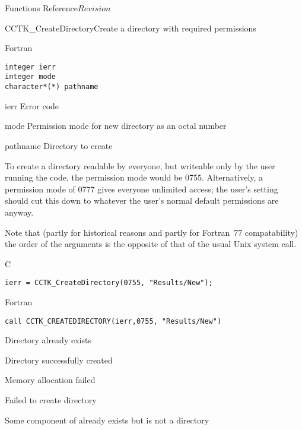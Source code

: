 \begin{cactuspart}{ Functions Reference}{}{$Revision$}
\begin{FunctionDescription}{CCTK\_CreateDirectory}{Create a directory with required permissions}
\begin{SynopsisSection}
\begin{Synopsis}{Fortran}
\begin{verbatim}
integer ierr
integer mode
character*(*) pathname \end{verbatim}
\end{Synopsis}
\end{SynopsisSection}
\begin{ParameterSection}
\begin{Parameter}{ierr}
Error code
\end{Parameter}
\begin{Parameter}{mode}
Permission mode for new directory as an octal number
\end{Parameter}
\begin{Parameter}{pathname}
Directory to create
\end{Parameter}
\end{ParameterSection}
\begin{Discussion}
To create a directory readable by everyone, but writeable only by the
user running the code, the permission mode would be 0755.
Alternatively, a permission mode of 0777 gives everyone unlimited
access; the user's  setting should cut this down to
whatever the user's normal default permissions are anyway.

Note that
(partly for historical reasons and partly for Fortran~77 compatability)
the order of the arguments is the opposite of that of the usual Unix
 system call.
\end{Discussion}
\begin{ExampleSection}
\begin{Example}{C}
\begin{verbatim}
ierr = CCTK_CreateDirectory(0755, "Results/New");
\end{verbatim}
\end{Example}
\begin{Example}{Fortran}
\begin{verbatim}
call CCTK_CREATEDIRECTORY(ierr,0755, "Results/New")
\end{verbatim}
\end{Example}
\end{ExampleSection}
\begin{ErrorSection}
\begin{Error}{1}Directory already exists\end{Error}
\begin{Error}{0}Directory successfully created\end{Error}
\begin{Error}{-1}Memory allocation failed\end{Error}
\begin{Error}{-2}Failed to create directory\end{Error}
\begin{Error}{-3}Some component of  already exists but is not a directory\end{Error}
\end{ErrorSection}
\end{FunctionDescription}



\end{cactuspart}
